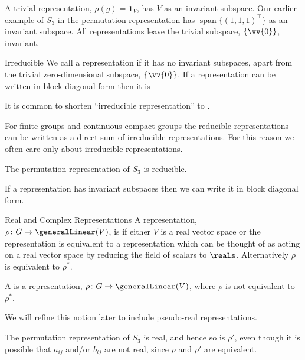 \documentclass[fleqn]{NotesClass}
\newcommand*{\trans}{\top}
\newcommand*{\ident}{\mathbf{1}}
\DeclareMathOperator{\spn}{span}
\begin{document}
    A trivial representation, \(\rho(g) = \ident_V\), has \(V\) as an invariant subspace.
    Our earlier example of \(S_3\) in the permutation representation has \(\spn\{(1, 1, 1)^\trans\}\) as an invariant subspace.
    All representations leave the trivial subspace, \(\{\vv{0}\}\), invariant.
    
    \begin{dfn}{Irreducible}{}
        We call a representation  if it has no invariant subspaces, apart from the trivial zero-dimensional subspace, \(\{\vv{0}\}\).
        If a representation can be written in block diagonal form then it is 
    \end{dfn}
    
    It is common to shorten \enquote{irreducible representation} to .
    
    For finite groups and continuous compact groups the reducible representations can be written as a direct sum of irreducible representations.
    For this reason we often care only about irreducible representations.
    
    The permutation representation of \(S_3\) is reducible.
    
    \begin{lma}{}{}
        If a representation has invariant subspaces then we can write it in block diagonal form.
    \end{lma}
    
    \begin{dfn}{Real and Complex Representations}{}
        A representation, \(\rho \colon G \to \generalLinear(V)\), is  if either \(V\) is a real vector space or the representation is equivalent to a representation which can be thought of as acting on a real vector space by reducing the field of scalars to \(\reals\).
        Alternatively \(\rho\) is equivalent to \(\rho^*\).
        
        A  is a representation, \(\rho \colon G \to \generalLinear(V)\), where \(\rho\) is not equivalent to \(\rho^*\).
    \end{dfn}
    
    We will refine this notion later to include pseudo-real representations.
    
    The permutation representation of \(S_3\) is real, and hence so is \(\rho'\), even though it is possible that \(a_{ij}\) and/or \(b_{ij}\) are not real, since \(\rho\) and \(\rho'\) are equivalent.
\end{document}
